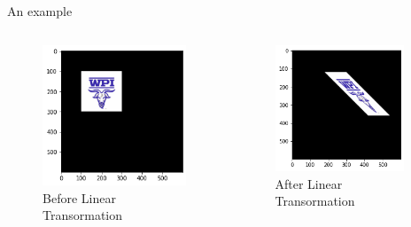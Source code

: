 \documentclass{beamer}
\theoremstyle{definition}
\theoremstyle{theorem}
\begin{document}
 \begin{frame}{An example}
\begin{columns}
    \begin{column}{0.47\textwidth}
        \begin{figure}
  \includegraphics[width= 1.\textwidth]{img1.png}
  \caption{Before Linear Transormation}
  \label{fig:goat1}
\end{figure}    \end{column}
    \begin{column}{0.5\textwidth}
        \begin{figure}
  \includegraphics[width= 0.9\textwidth]{img2.png}
  \caption{After Linear Transormation}
  \label{fig:goat2}
\end{figure}
    \end{column}
\end{columns}
\end{frame}
\end{document}
